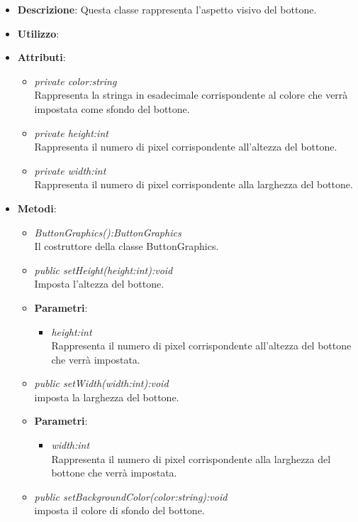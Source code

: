 \begin{itemize}
\item \textbf{Descrizione}: Questa classe rappresenta l'aspetto visivo del bottone.
\item \textbf{Utilizzo}:
\item \textbf{Attributi}:
	\begin{itemize}
	\item \textit{private color:string}\\
	Rappresenta la stringa in esadecimale corrispondente al colore che verrà impostata come sfondo del bottone.
	\item \textit{private height:int}\\
	Rappresenta il numero di pixel corrispondente all'altezza del bottone. 
	\item \textit{private width:int}\\
	Rappresenta il numero di pixel corrispondente alla larghezza del bottone.
	\end{itemize}
\item \textbf{Metodi}:
	\begin{itemize}
	\item \textit{ButtonGraphics():ButtonGraphics}\\
	Il costruttore della classe ButtonGraphics.
	\item \textit{public setHeight(height:int):void}\\
	Imposta l'altezza del bottone.
		\item{\textbf{Parametri}: \begin{itemize}
		\item \textit{height:int}\\
		Rappresenta il numero di pixel corrispondente all'altezza del bottone che verrà impostata.
		\end{itemize}}
	\item \textit{public setWidth(width:int):void}\\
	imposta la larghezza del bottone.
		\item{\textbf{Parametri}: \begin{itemize}
		\item \textit{width:int}\\
		Rappresenta il numero di pixel corrispondente alla larghezza del bottone che verrà impostata.
		\end{itemize}}
	\item \textit{public setBackgroundColor(color:string):void}\\
	imposta il colore di sfondo del bottone.

\end{itemize}
\end{itemize}

